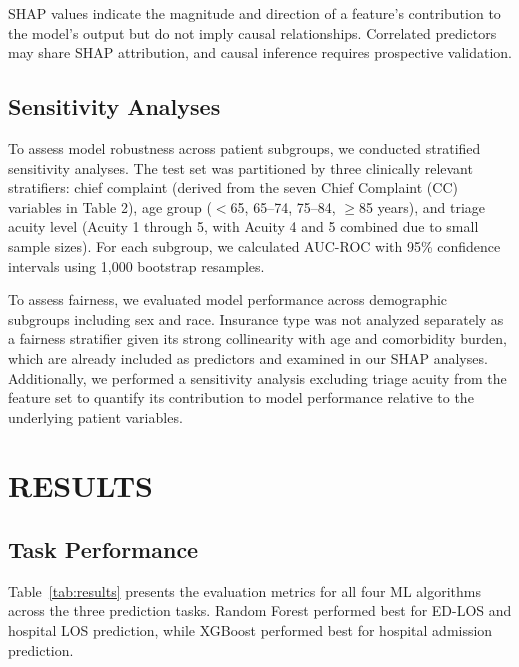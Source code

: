 \documentclass[harvard,article]{frontiersinFPHY_FAMS}
\begin{document}
SHAP values indicate the magnitude and direction of a feature's contribution to the model's output but do not imply causal relationships. Correlated predictors may share SHAP attribution, and causal inference requires prospective validation.

\subsection{Sensitivity Analyses}

To assess model robustness across patient subgroups, we conducted stratified sensitivity analyses. The test set was partitioned by three clinically relevant stratifiers: chief complaint (derived from the seven Chief Complaint (CC) variables in Table 2), age group ($<$65, 65--74, 75--84, $\geq$85 years), and triage acuity level (Acuity 1 through 5, with Acuity 4 and 5 combined due to small sample sizes). For each subgroup, we calculated AUC-ROC with 95\% confidence intervals using 1,000 bootstrap resamples.

To assess fairness, we evaluated model performance across demographic subgroups including sex and race. Insurance type was not analyzed separately as a fairness stratifier given its strong collinearity with age and comorbidity burden, which are already included as predictors and examined in our SHAP analyses. Additionally, we performed a sensitivity analysis excluding triage acuity from the feature set to quantify its contribution to model performance relative to the underlying patient variables.


\section{RESULTS}

\subsection{Task Performance}

Table~\ref{tab:results} presents the evaluation metrics for all four ML algorithms across the three prediction tasks. Random Forest performed best for ED-LOS and hospital LOS prediction, while XGBoost performed best for hospital admission prediction.
\end{document}

